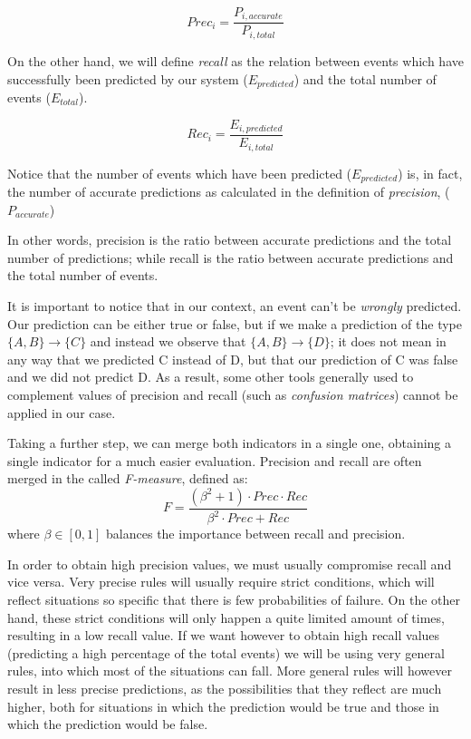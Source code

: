 \begin{equation}
Prec_i = \dfrac{ P_{i, accurate}}{ P_{i, total} }
\end{equation}

On the other hand, we will define \emph{recall} as the relation between events which have successfully been predicted by our system ($E_{predicted}$) and the total number of events ($E_{total}$). 

\begin{equation}
Rec_i = \dfrac{ E_{i, predicted}}{ E_{i, total} }
\end{equation}

Notice that the number of events which have been predicted ($E_{predicted}$) is, in fact, the number of accurate predictions as calculated in the definition of \emph{precision}, ($P_{accurate}$)

In other words, precision is the ratio between accurate predictions and the total number of predictions; while recall is the ratio between accurate predictions and the total number of events.

It is important to notice that in our context, an event can't be \emph{wrongly} predicted. Our prediction can be either true or false, but if we make a prediction of the type $\{A, B\} \longrightarrow \{C\}$ and instead we observe that $\{A, B\} \longrightarrow \{D\}$; it does not mean in any way that we predicted C instead of D, but that our prediction of C was false and we did not predict D. As a result, some other tools generally used to complement values of precision and recall (such as \emph{confusion matrices}) cannot be applied in our case.

Taking a further step, we can merge both indicators in a single one, obtaining a single indicator for a much easier evaluation. Precision and recall are often merged in the called \emph{F-measure}, defined as:
\begin{equation}
F = \dfrac{(\beta^{2}+1) \cdot Prec \cdot Rec}{\beta^{2} \cdot Prec+Rec}
\end{equation}
where $\beta\in [0,1]$ balances the importance between recall and precision.

In order to obtain high precision values, we must usually compromise recall and vice versa. Very precise rules will usually require strict conditions, which will reflect situations so specific that there is few probabilities of failure. On the other hand, these strict conditions will only happen a quite limited amount of times, resulting in a low recall value. If we want however to obtain high recall values (predicting a high percentage of the total events) we will be using very general rules, into which most of the situations can fall. More general rules will however result in less precise predictions, as the possibilities that they reflect are much higher, both for situations in which the prediction would be true and those in which the prediction would be false.

